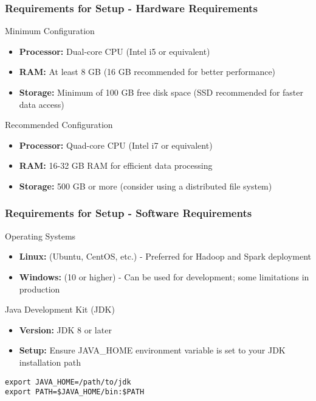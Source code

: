 \documentclass{beamer}
\begin{document}
\begin{frame}[fragile]
    \frametitle{Requirements for Setup - Hardware Requirements}
    \begin{block}{Minimum Configuration}
        \begin{itemize}
            \item \textbf{Processor:} Dual-core CPU (Intel i5 or equivalent)
            \item \textbf{RAM:} At least 8 GB (16 GB recommended for better performance)
            \item \textbf{Storage:} Minimum of 100 GB free disk space (SSD recommended for faster data access)
        \end{itemize}
    \end{block}
    
    \begin{block}{Recommended Configuration}
        \begin{itemize}
            \item \textbf{Processor:} Quad-core CPU (Intel i7 or equivalent)
            \item \textbf{RAM:} 16-32 GB RAM for efficient data processing
            \item \textbf{Storage:} 500 GB or more (consider using a distributed file system)
        \end{itemize}
    \end{block}
\end{frame}

\begin{frame}[fragile]
    \frametitle{Requirements for Setup - Software Requirements}
    \begin{block}{Operating Systems}
        \begin{itemize}
            \item \textbf{Linux:} (Ubuntu, CentOS, etc.) - Preferred for Hadoop and Spark deployment
            \item \textbf{Windows:} (10 or higher) - Can be used for development; some limitations in production
        \end{itemize}
    \end{block}

    \begin{block}{Java Development Kit (JDK)}
        \begin{itemize}
            \item \textbf{Version:} JDK 8 or later
            \item \textbf{Setup:} Ensure JAVA\_HOME environment variable is set to your JDK installation path
        \end{itemize}
        \begin{lstlisting}
export JAVA_HOME=/path/to/jdk
export PATH=$JAVA_HOME/bin:$PATH
        \end{lstlisting}
    \end{block}
\end{frame}
\end{document}

